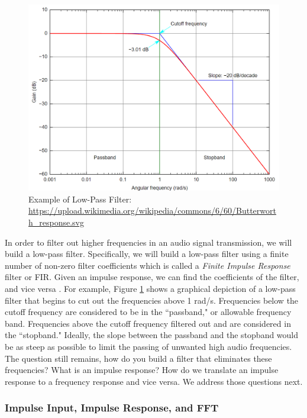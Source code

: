 \begin{figure}[h!]
	\centering
	\includegraphics[scale = .5]{images/low_pass.png} %
	\caption{Example of Low-Pass Filter: \url{https://upload.wikimedia.org/wikipedia/commons/6/60/Butterworth_response.svg}}
	\label{fig:lowpass}
\end{figure}    

In order to filter out higher frequencies in an audio signal
transmission, we will build a low-pass filter. Specifically, we
will build a low-pass filter using a finite number of non-zero
filter coefficients which is called a \textit{Finite Impulse
Response} filter or FIR. Given an impulse response, we can find
the coefficients of the filter, and vice versa
\cite{notes:class}. For example, Figure \ref{fig:lowpass} shows a
graphical depiction of a low-pass filter that begins to cut out
the frequencies above 1 rad/s. Frequencies below the cutoff
frequency are considered to be in the
``passband," or allowable frequency band.  Frequencies above the cutoff frequency filtered out and are considered in the ``stopband."
Ideally, the slope between the passband and the stopband would be
as steep as possible to limit the passing of unwanted high audio
frequencies. The question still remains, how do you build a
filter that eliminates these frequencies? What is an impulse
response? How do we translate an impulse response to a frequency
response and vice versa. We address those questions next.

\subsubsection{Impulse Input, Impulse Response, and FFT}

